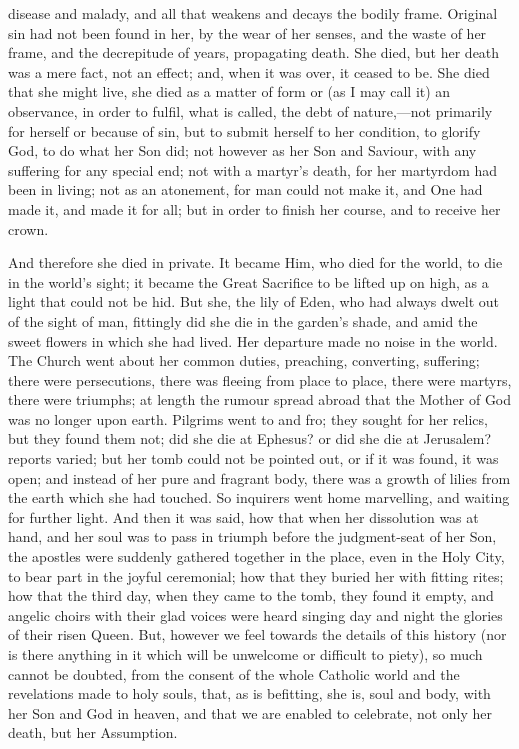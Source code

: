 disease and malady, and all that weakens and decays the bodily frame.
Original sin had not been found in her, by the wear of her senses, and
the waste of her frame, and the decrepitude of years, propagating
death. She died, but her death was a mere fact, not an effect; and,
when it was over, it ceased to be. She died that she might live, she
died as a matter of form or (as I may call it) an observance, in order
to fulfil, what is called, the debt of nature,—not primarily for
herself or because of sin, but to submit herself to her condition, to
glorify God, to do what her Son did; not however as her Son and
Saviour, with any suffering for any special end; not with a martyr's
death, for her martyrdom had been in living; not as an atonement, for
man could not make it, and One had made it, and made it for all; but
in order to finish her course, and to receive her crown.

And therefore she died in private. It became Him, who died for the
world, to die in the world's sight; it became the Great Sacrifice to
be lifted up on high, as a light that could not be hid. But she, the
lily of Eden, who had always dwelt out of the sight of man, fittingly
did she die in the garden's shade, and amid the sweet flowers in which
she had lived. Her departure made no noise in the world. The Church
went about her common duties, preaching, converting, suffering; there
were persecutions, there was fleeing from place to place, there were
martyrs, there were triumphs; at length the rumour spread abroad that
the Mother of God was no longer upon earth. Pilgrims went to and fro;
they sought for her relics, but they found them not; did she die at
Ephesus? or did she die at Jerusalem? reports varied; but her tomb
could not be pointed out, or if it was found, it was open; and instead
of her pure and fragrant body, there was a growth of lilies from the
earth which she had touched. So inquirers went home marvelling, and
waiting for further light. And then it was said, how that when her
dissolution was at hand, and her soul was to pass in triumph before
the judgment-seat of her Son, the apostles were suddenly gathered
together in the place, even in the Holy City, to bear part in the
joyful ceremonial; how that they buried her with fitting rites; how
that the third day, when they came to the tomb, they found it empty,
and angelic choirs with their glad voices were heard singing day and
night the glories of their risen Queen. But, however we feel towards
the details of this history (nor is there anything in it which will be
unwelcome or difficult to piety), so much cannot be doubted, from the
consent of the whole Catholic world and the revelations made to holy
souls, that, as is befitting, she is, soul and body, with her Son and
God in heaven, and that we are enabled to celebrate, not only her
death, but her Assumption.

